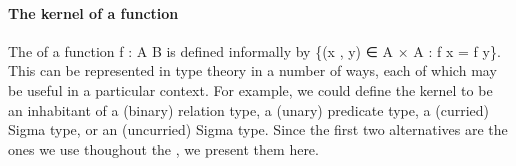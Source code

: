\paragraph*{The kernel of a function}
The  of a function \ab f \as : \ab A  \ab B is defined informally by \{(\ab x , \ab y) ∈ \ab A × \ab A : \ab f \ab x = \ab f \ab y\}. This can be represented in type theory in a number of ways, each of which may be useful in a particular context. For example, we could define the kernel to be an inhabitant of a (binary) relation type, a (unary) predicate type, a (curried) Sigma type, or an (uncurried) Sigma type. Since the first two alternatives are the ones we use thoughout the \ualib, we present them here.
\ccpad
\begin{code}%
\>[1]\AgdaSpace{}%
\AgdaSymbol{:}\AgdaSpace{}%
\AgdaSymbol{(}\AgdaSpace{}%
\AgdaSpace{}%
\AgdaSymbol{)}\AgdaSpace{}%
\AgdaSpace{}%
\AgdaSpace{}%
\AgdaSpace{}%
\<%
\\
%
\>[1]\AgdaSpace{}%
\AgdaSpace{}%
\AgdaSpace{}%
\AgdaSpace{}%
\AgdaSymbol{=}\AgdaSpace{}%
\AgdaSpace{}%
\AgdaSpace{}%
\AgdaSpace{}%
\AgdaSpace{}%
\<%
\\
%
\\[\AgdaEmptyExtraSkip]%
%
\>[1]\AgdaSpace{}%
\AgdaSymbol{:}\AgdaSpace{}%
\AgdaSymbol{(}\AgdaSpace{}%
\AgdaSpace{}%
\AgdaSymbol{)}\AgdaSpace{}%
\AgdaSpace{}%
\AgdaSpace{}%
\AgdaSymbol{(}\AgdaSpace{}%
\AgdaSpace{}%
\AgdaSymbol{)}\AgdaSpace{}%
\<%
\\
%
\>[1]\AgdaSpace{}%
\AgdaSpace{}%
\AgdaSymbol{(}\AgdaSpace{}%
\AgdaOperator{\AgdaInductiveConstructor{,}}\AgdaSpace{}%
\AgdaSymbol{)}\AgdaSpace{}%
\AgdaSymbol{=}\AgdaSpace{}%
\AgdaSpace{}%
\AgdaSpace{}%
\AgdaSpace{}%
\AgdaSpace{}%
\<%

\end{code}
